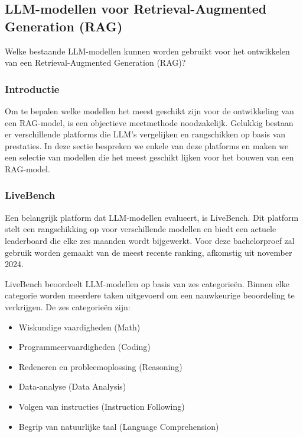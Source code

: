     \subsection{LLM-modellen voor Retrieval-Augmented Generation (RAG)}
    Welke bestaande LLM-modellen kunnen worden gebruikt voor het ontwikkelen van een Retrieval-Augmented Generation (RAG)?


        \subsubsection{Introductie}
        Om te bepalen welke modellen het meest geschikt zijn voor de ontwikkeling van een RAG-model, is een objectieve meetmethode noodzakelijk. Gelukkig bestaan er verschillende platforms die LLM's vergelijken en rangschikken op basis van prestaties. In deze sectie bespreken we enkele van deze platforms en maken we een selectie van modellen die het meest geschikt lijken voor het bouwen van een RAG-model.
        
        
        \subsubsection{LiveBench} 
        Een belangrijk platform dat LLM-modellen evalueert, is LiveBench. Dit platform stelt een rangschikking op voor verschillende modellen en biedt een actuele leaderboard die elke zes maanden wordt bijgewerkt. Voor deze bachelorproef zal gebruik worden gemaakt van de meest recente ranking, afkomstig uit november 2024.
        
        LiveBench beoordeelt LLM-modellen op basis van zes categorieën. Binnen elke categorie worden meerdere taken uitgevoerd om een nauwkeurige beoordeling te verkrijgen. De zes categorieën zijn:
            \begin{itemize}
            \item Wiskundige vaardigheden (Math)
            \item Programmeervaardigheden (Coding)
            \item Redeneren en probleemoplossing (Reasoning)
            \item Data-analyse (Data Analysis)
            \item Volgen van instructies (Instruction Following)
            \item Begrip van natuurlijke taal (Language Comprehension)
            \end{itemize}
        
